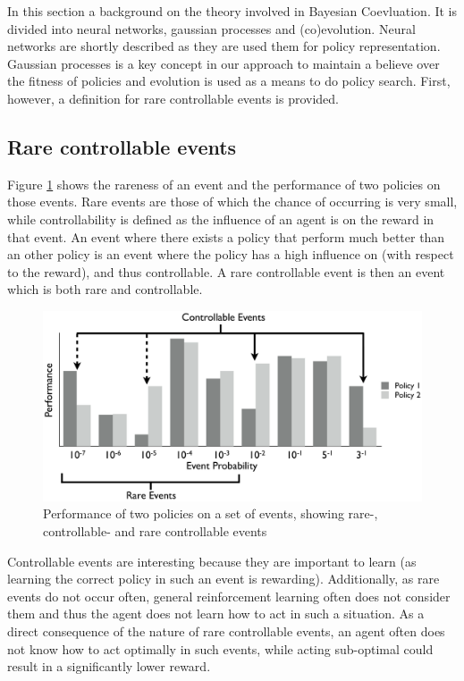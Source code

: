 In this section a background on the theory involved in Bayesian Coevluation. It is divided into neural networks, gaussian processes and (co)evolution. Neural networks are shortly described as they are used them for policy representation. Gaussian processes is a key concept in our approach to maintain a believe over the fitness of policies and evolution is used as a means to do policy search. First, however, a definition for rare controllable events is provided.

\subsection{Rare controllable events}
Figure \ref{rareControllableImage} shows the rareness of an event and the performance of two policies on those events. Rare events are those of which the chance of occurring is very small, while controllability is defined as the influence of an agent is on the reward in that event. An event where there exists a policy that perform much better than an other policy is an event where the policy has a high influence on (with respect to the reward), and thus controllable. A rare controllable event is then an event which is both rare and controllable.

\begin{figure}[h]
  \centering
  \includegraphics{images/rare-controllable.png}
  \caption{Performance of two policies on a set of events, showing rare-, controllable- and rare controllable events}\label{rareControllableImage}
\end{figure}

Controllable events are interesting because they are important to learn (as learning the correct policy in such an event is rewarding). Additionally, as rare events do not occur often, general reinforcement learning often does not consider them and thus the agent does not learn how to act in such a situation. As a direct consequence of the nature of rare controllable events, an agent often does not know how to act optimally in such events, while acting sub-optimal could result in a significantly lower reward.

